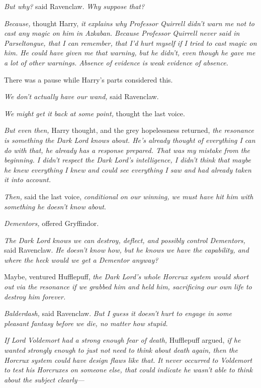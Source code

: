 \emph{But why?} said Ravenclaw. \emph{Why suppose that?}

\emph{Because,} thought Harry, \emph{it explains why Professor Quirrell didn't \emph{warn me} not to cast any magic on him in Azkaban. Because Professor Quirrell never said in Parseltongue, that I can remember, that I'd hurt myself if I tried to cast magic on him. He could have given me that warning, but he didn't, even though he gave me a lot of other warnings. Absence of evidence is weak evidence of absence.}

There was a pause while Harry's parts considered this.

\emph{We don't actually have our wand,} said Ravenclaw.

\emph{We might get it back at some point,} thought the last voice.

\emph{But even then,} Harry thought, and the grey hopelessness returned, \emph{the resonance is something the Dark Lord knows about. He's already thought of everything I can do with that, he already has a response prepared. That was my mistake from the beginning. I didn't respect the Dark Lord's intelligence, I didn't think that maybe he knew everything I knew and could see everything I saw and had already taken it into account.}

\emph{Then,} said the last voice, \emph{conditional on our winning, we must have hit him with something he doesn't know about}.

\emph{Dementors,} offered Gryffindor.

\emph{The Dark Lord \emph{knows} we can destroy, deflect, and possibly control Dementors,} said Ravenclaw. \emph{He doesn't know how, but he knows we have the capability, and where the heck would we get a Dementor anyway?}

Maybe, ventured Hufflepuff, \emph{the Dark Lord's whole Horcrux system would short out via the resonance if we grabbed him and held him, sacrificing our own life to destroy him forever.}

\emph{Balderdash,} said Ravenclaw. \emph{But I guess it doesn't hurt to engage in some pleasant fantasy before we die, no matter how stupid.}

\emph{If Lord Voldemort had a strong enough fear of death,} Hufflepuff argued, \emph{if he wanted strongly enough to just not need to think about death again, then the Horcrux system \emph{could} have design flaws like that. It never occurred to Voldemort to test his Horcruxes on someone else, that could indicate he wasn't able to think about the subject clearly—}

